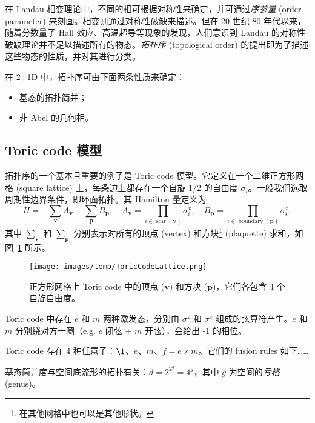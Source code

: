 在 Landau 相变理论中，不同的相可根据对称性来确定，并可通过\emph{序参量} (order parameter) 来刻画。相变则通过对称性破缺来描述。但在 20 世纪 80 年代以来，随着分数量子 Hall 效应、高温超导等现象的发现，人们意识到 Landau 的对称性破缺理论并不足以描述所有的物态。\emph{拓扑序} (topological order) 的提出即为了描述这些物态的性质，并对其进行分类。

在 2+1D 中，拓扑序可由下面两条性质来确定\cite{zeng2019introduction}：
\begin{itemize}
  \item 基态的拓扑简并；
  \item 非 Abel 的几何相。
\end{itemize}

\subsection{Toric code 模型}

拓扑序的一个基本且重要的例子是 Toric code 模型\cite{kitaev2003fault}。它定义在一个二维正方形网格 (square lattice) 上，每条边上都存在一个自旋 $1/2$ 的自由度 $\sigma_i$。一般我们选取周期性边界条件，即环面拓扑。其 Hamilton 量定义为
\begin{equation}
  H = -\sum_{\bm{v}} A_{\bm{v}} - \sum_{\bm{p}} B_{\bm{p}}, \quad
  A_{\bm{v}} = \prod_{i\in\operatorname{star}(\bm{v})} \sigma_i^x, \quad
  B_{\bm{p}} = \prod_{i\in\operatorname{boundary}(\bm{p})} \sigma_i^z,
  \label{eq:toric-code-hamiltonian}
\end{equation}
其中 $\sum_{\bm{v}}$ 和 $\sum_{\bm{p}}$ 分别表示对所有的顶点 (vertex) 和方块\footnote{在其他网格中也可以是其他形状。} (plaquette) 求和，如图~\ref{fig:toric-code-vertex-plaquette} 所示。

\begin{figure}[htb]
  \centering
  \texttt{[image: images/temp/ToricCodeLattice.png]}
  \caption[Toric code 中的顶点和方块]{正方形网格上 Toric code 中的顶点 ($\bm{v}$) 和方块 ($\bm{p}$)，它们各包含 4 个自旋自由度。}
  \label{fig:toric-code-vertex-plaquette}
\end{figure}

Toric code 中存在 $e$ 和 $m$ 两种激发态，分别由 $\sigma^z$ 和 $\sigma^x$ 组成的弦算符产生。$e$ 和 $m$ 分别绕对方一圈（e.g. $e$ 闭弦 + $m$ 开弦），会给出 -1 的相位。

Toric code 存在 4 种任意子：$\1$、$e$、$m$、$f=e\times m$。它们的 fusion rules 如下……

基态简并度与空间底流形的拓扑有关：$d=2^{2^g}=4^g$，其中 $g$ 为空间的\emph{亏格} (genus)。

